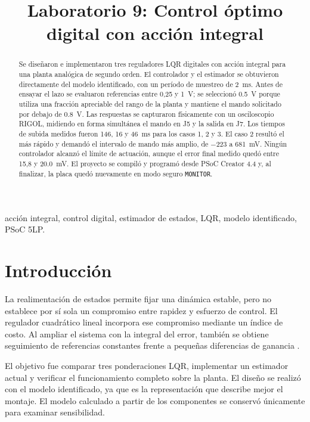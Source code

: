 \documentclass[conference]{IEEEtran}
\title{Laboratorio 9: Control óptimo digital con acción integral}
\author{\IEEEauthorblockN{Aldo Pastore}
\IEEEauthorblockA{Automatización -- Ingeniería Electrónica\\
Facultad de Ciencias y Tecnología\\
Universidad Católica “Nuestra Señora de la Asunción”\\
Asunción, Paraguay\\
\texttt{aldo.pastore@uc.edu.py}}}
\begin{document}
\maketitle

\begin{abstract}
Se diseñaron e implementaron tres reguladores LQR digitales con acción integral para una planta analógica de segundo orden. El controlador y el estimador se obtuvieron directamente del modelo identificado, con un período de muestreo de \SI{2}{ms}. Antes de ensayar el lazo se evaluaron referencias entre 0,25 y \SI{1}{V}; se seleccionó \SI{0.5}{V} porque utiliza una fracción apreciable del rango de la planta y mantiene el mando solicitado por debajo de \SI{0.8}{V}. Las respuestas se capturaron físicamente con un osciloscopio RIGOL, midiendo en forma simultánea el mando en J5 y la salida en J7. Los tiempos de subida medidos fueron 146, 16 y \SI{46}{ms} para los casos 1, 2 y 3. El caso 2 resultó el más rápido y demandó el intervalo de mando más amplio, de $-223$ a \SI{681}{mV}. Ningún controlador alcanzó el límite de actuación, aunque el error final medido quedó entre 15,8 y \SI{20.0}{mV}. El proyecto se compiló y programó desde PSoC Creator 4.4 y, al finalizar, la placa quedó nuevamente en modo seguro \texttt{MONITOR}.
\end{abstract}

\begin{IEEEkeywords}
acción integral, control digital, estimador de estados, LQR, modelo identificado, PSoC 5LP.
\end{IEEEkeywords}

\section{Introducción}
La realimentación de estados permite fijar una dinámica estable, pero no establece por sí sola un compromiso entre rapidez y esfuerzo de control. El regulador cuadrático lineal incorpora ese compromiso mediante un índice de costo. Al ampliar el sistema con la integral del error, también se obtiene seguimiento de referencias constantes frente a pequeñas diferencias de ganancia \cite{ogata,franklin}.

El objetivo fue comparar tres ponderaciones LQR, implementar un estimador actual y verificar el funcionamiento completo sobre la planta. El diseño se realizó con el modelo identificado, ya que es la representación que describe mejor el montaje. El modelo calculado a partir de los componentes se conservó únicamente para examinar sensibilidad.
\end{document}
